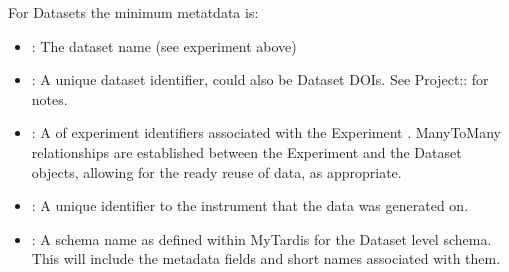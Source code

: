 \documentclass[letterpaper,10pt,english]{sphinxmanual}
\begin{document}
\sphinxAtStartPar
For Datasets the minimum metatdata is:
\begin{itemize}
\item {}
\sphinxAtStartPar
{}: The dataset name (see experiment  above)

\item {}
\sphinxAtStartPar
{}: A unique dataset identifier, could also be Dataset DOIs. See Project:: for notes.

\item {}
\sphinxAtStartPar
{}: A  of experiment identifiers associated with the Experiment .  Many\sphinxhyphen{}To\sphinxhyphen{}Many relationships are established between the Experiment and the Dataset objects, allowing for the ready re\sphinxhyphen{}use of data, as appropriate.

\item {}
\sphinxAtStartPar
{}: A unique identifier to the instrument that the data was generated on.

\item {}
\sphinxAtStartPar
{}: A schema name as defined within MyTardis for the Dataset level schema. This will include the metadata fields and short names associated with them.

\end{itemize}
\end{document}

